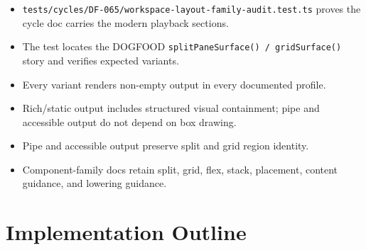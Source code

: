 \begin{itemize}
\tightlist
\item
  \texttt{t\allowbreak{}e\allowbreak{}s\allowbreak{}t\allowbreak{}s\allowbreak{}/\allowbreak{}c\allowbreak{}y\allowbreak{}c\allowbreak{}l\allowbreak{}e\allowbreak{}s\allowbreak{}/\allowbreak{}D\allowbreak{}F\allowbreak{}-\allowbreak{}0\allowbreak{}6\allowbreak{}5\allowbreak{}/\allowbreak{}w\allowbreak{}o\allowbreak{}r\allowbreak{}k\allowbreak{}s\allowbreak{}p\allowbreak{}a\allowbreak{}c\allowbreak{}e\allowbreak{}-\allowbreak{}l\allowbreak{}a\allowbreak{}y\allowbreak{}o\allowbreak{}u\allowbreak{}t\allowbreak{}-\allowbreak{}f\allowbreak{}a\allowbreak{}m\allowbreak{}i\allowbreak{}l\allowbreak{}y\allowbreak{}-\allowbreak{}a\allowbreak{}u\allowbreak{}d\allowbreak{}i\allowbreak{}t\allowbreak{}.\allowbreak{}t\allowbreak{}e\allowbreak{}s\allowbreak{}t\allowbreak{}.\allowbreak{}t\allowbreak{}s} proves the cycle doc carries the modern playback sections.
\item
  The test locates the DOGFOOD \texttt{s\allowbreak{}p\allowbreak{}l\allowbreak{}i\allowbreak{}t\allowbreak{}P\allowbreak{}a\allowbreak{}n\allowbreak{}e\allowbreak{}S\allowbreak{}u\allowbreak{}r\allowbreak{}f\allowbreak{}a\allowbreak{}c\allowbreak{}e\allowbreak{}(\allowbreak{})\allowbreak{} \allowbreak{}/\allowbreak{} \allowbreak{}g\allowbreak{}r\allowbreak{}i\allowbreak{}d\allowbreak{}S\allowbreak{}u\allowbreak{}r\allowbreak{}f\allowbreak{}a\allowbreak{}c\allowbreak{}e\allowbreak{}(\allowbreak{})} story and verifies expected variants.
\item
  Every variant renders non-empty output in every documented profile.
\item
  Rich/static output includes structured visual containment; pipe and accessible output do not depend on box drawing.
\item
  Pipe and accessible output preserve split and grid region identity.
\item
  Component-family docs retain split, grid, flex, stack, placement, content guidance, and lowering guidance.
\end{itemize}

\section{Implementation Outline}\label{record-106-implementation-outline}

